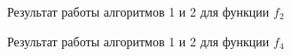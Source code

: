 \documentclass[a4paper, 12pt]{article}
\begin{document}
      \begin{figure}[h]
        \begin{minipage}[h]{\linewidth}
        \end{minipage}
        \vfill
        \begin{minipage}[h]{\linewidth}
        \end{minipage}
        \caption{Результат работы алгоритмов 1 и 2 для функции $f_2$}
        \label{ris:image1}
        \end{figure}

        \begin{figure}[h]
          \begin{minipage}[h]{\linewidth}
          \end{minipage}
          \vfill
          \begin{minipage}[h]{\linewidth}
          \end{minipage}
          \caption{Результат работы алгоритмов 1 и 2 для функции $f_4$}
          \label{ris:image1}
          \end{figure}
\end{document}
